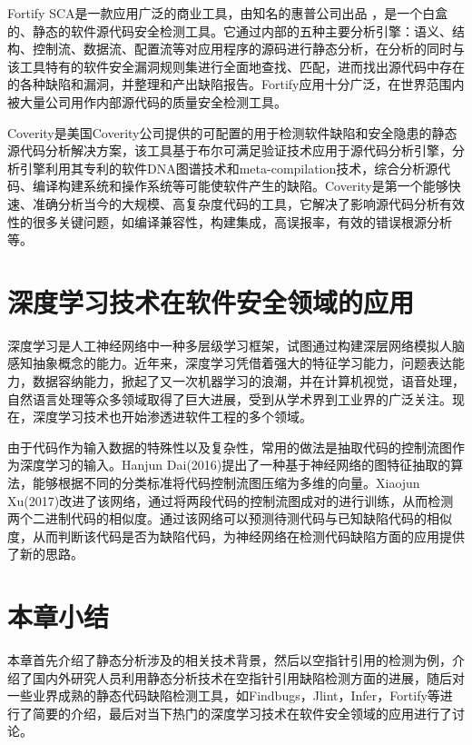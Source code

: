 Fortify SCA是一款应用广泛的商业工具，由知名的惠普公司出品 ，是一个白盒的、静态的软件源代码安全检测工具。它通过内部的五种主要分析引擎：语义、结构、控制流、数据流、配置流等对应用程序的源码进行静态分析，在分析的同时与该工具特有的软件安全漏洞规则集进行全面地查找、匹配，进而找出源代码中存在的各种缺陷和漏洞，并整理和产出缺陷报告。Fortify应用十分广泛，在世界范围内被大量公司用作内部源代码的质量安全检测工具。

Coverity是美国Coverity公司提供的可配置的用于检测软件缺陷和安全隐患的静态源代码分析解决方案，该工具基于布尔可满足验证技术应用于源代码分析引擎，分析引擎利用其专利的软件DNA图谱技术和meta-compilation技术，综合分析源代码、编译构建系统和操作系统等可能使软件产生的缺陷。Coverity是第一个能够快速、准确分析当今的大规模、高复杂度代码的工具，它解决了影响源代码分析有效性的很多关键问题，如编译兼容性，构建集成，高误报率，有效的错误根源分析等。

\section{深度学习技术在软件安全领域的应用}
深度学习是人工神经网络中一种多层级学习框架，试图通过构建深层网络模拟人脑感知抽象概念的能力。近年来，深度学习凭借着强大的特征学习能力，问题表达能力，数据容纳能力，掀起了又一次机器学习的浪潮，并在计算机视觉，语音处理，自然语言处理等众多领域取得了巨大进展，受到从学术界到工业界的广泛关注。现在，深度学习技术也开始渗透进软件工程的多个领域。

由于代码作为输入数据的特殊性以及复杂性，常用的做法是抽取代码的控制流图作为深度学习的输入。Hanjun Dai(2016)提出了一种基于神经网络的图特征抽取的算法，能够根据不同的分类标准将代码控制流图压缩为多维的向量。Xiaojun Xu(2017)改进了该网络，通过将两段代码的控制流图成对的进行训练，从而检测两个二进制代码的相似度。通过该网络可以预测待测代码与已知缺陷代码的相似度，从而判断该代码是否为缺陷代码，为神经网络在检测代码缺陷方面的应用提供了新的思路。


\section{本章小结}
本章首先介绍了静态分析涉及的相关技术背景，然后以空指针引用的检测为例，介绍了国内外研究人员利用静态分析技术在空指针引用缺陷检测方面的进展，随后对一些业界成熟的静态代码缺陷检测工具，如Findbugs，Jlint，Infer，Fortify等进行了简要的介绍，最后对当下热门的深度学习技术在软件安全领域的应用进行了讨论。